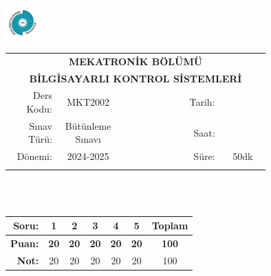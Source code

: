 \newcommand\UniversiteAdi{Niğde Ömer Halisdemir Üniversitesi}
\newcommand\BolumAdi{MEKATRONİK BÖLÜMÜ}
\newcommand\DersKodu{MKT2002}
\newcommand\DersAdi{BİLGİSAYARLI KONTROL SİSTEMLERİ}
\newcommand\SinavAdi{Bütünleme Sınavı}
\newcommand\SinavTarihi{ }
\newcommand\SinavSaati{ }
\newcommand\SinavSuresi{50dk}

\pagestyle{fancy}
\fancyhf{} %
\noindent \includegraphics[width=0.1\textwidth]{logo}
\begin{tabular}{
		p{0.15\linewidth}
		p{0.15\linewidth}
		p{0.2\linewidth}
		p{0.1\linewidth}
		p{0.15\linewidth}}
	\multicolumn{5}{c}{\textbf{\BolumAdi}}        \\
	\multicolumn{5}{c}{\textbf{\DersAdi}}         \\\hline
	\multicolumn{1}{|r|}{Ders Kodu:}  &
	\multicolumn{1}{|c|}{\DersKodu}   &
	\multicolumn{1}{|c|}{}            &
	\multicolumn{1}{|r|}{Tarih:}      &
	\multicolumn{1}{|c|}{\SinavTarihi}            \\\hline
	\multicolumn{1}{|r|}{Sınav Türü:} &
	\multicolumn{1}{|c|}{\SinavAdi}   &
	\multicolumn{1}{|c|}{}            &
	\multicolumn{1}{|r|}{Saat:}       &
	\multicolumn{1}{|c|}{\SinavSaati}             \\\hline
	\multicolumn{1}{|r|}{Dönemi:}     &
	\multicolumn{1}{|c|}{2024-2025}   &
	\multicolumn{1}{|c|}{}            &
	\multicolumn{1}{|r|}{Süre:}       &
	\multicolumn{1}{|c|}{\SinavSuresi}            \\\hline
	                                  &   &  &  & \\
\end{tabular}\\\\
\noindent\begin{center}
	\begin{tabular}{|r|c|c|c|c|c|c|}\hline
		\textbf{Soru:} &
		\textbf{1}     &
		\textbf{2}     &
		\textbf{3}     &
		\textbf{4}     &
		\textbf{5}     &
		\textbf{Toplam}                  \\\hline
		\textbf{Puan:} &
		\textbf{20}    &
		\textbf{20}    &
		\textbf{20}    &
		\textbf{20}    &
		\textbf{20}    &
		\textbf{100}                     \\\hline
		\textbf{Not:}  & 20&20&20&20&  20& 100\\\hline
	\end{tabular}\end{center}
